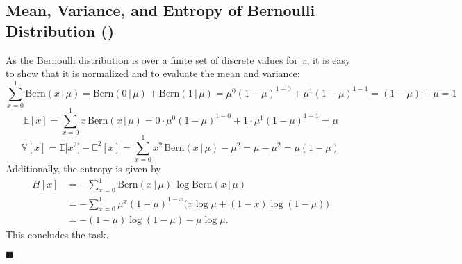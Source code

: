 \documentclass[11pt, a4paper]{scrartcl}
\newcommand{\E}{\mathbb{E}}
\newcommand{\Var}{\mathbb{V}}
\newcommand{\given}{\,\vert\,}
\newcommand{\eot}{\hfill\(\blacksquare\)}
\newcommand{\diffstar}{\texorpdfstring{\raisebox{-1pt}{\resizebox{!}{8pt}{\(\star\)}}}{*}}
\newcommand{\onestar}  {(\diffstar)}
\begin{document}
		\subsection{Mean, Variance, and Entropy of Bernoulli Distribution  \onestar}
			As the Bernoulli distribution is over a finite set of discrete values for \(x\), it is easy to show that it is normalized and to evaluate the mean and variance:
			\begin{equation}
				\sum_{x = 0}^{1} \mathrm{Bern}(x \given \mu)
					= \mathrm{Bern}(0 \given \mu) + \mathrm{Bern}(1 \given \mu)
					= \mu^0 (1 - \mu)^{1 - 0} + \mu^1 (1 - \mu)^{1 - 1}
					= (1 - \mu) + \mu
					= 1
			\end{equation}
			\begin{equation}
				\E[x]
					= \sum_{x = 0}^{1} x \,\mathrm{Bern}(x \given \mu)
					= 0 \cdot \mu^0 (1 - \mu)^{1 - 0} + 1 \cdot \mu^1 (1 - \mu)^{1 - 1}
					= \mu
			\end{equation}
			\begin{equation}
				\Var[x]
					= \E\big[x^2\big] - \E^2[x]
					= \sum_{x = 0}^{1} x^2 \,\mathrm{Bern}(x \given \mu) - \mu^2
					= \mu - \mu^2
					= \mu (1 - \mu)
			\end{equation}
			Additionally, the entropy is given by
			\begin{align}
				H[x]
					&= -\sum_{x = 0}^{1} \mathrm{Bern}(x \given \mu) \, \log \mathrm{Bern}(x \given \mu) \\
					&= -\sum_{x = 0}^{1} \mu^x (1 - \mu)^{1 - x} \big( x \log \mu + (1 - x) \log (1 - \mu) \big) \\
					&= -(1 - \mu) \log (1 - \mu) - \mu \log \mu.
			\end{align}
			This concludes the task.

			\eot
\end{document}
